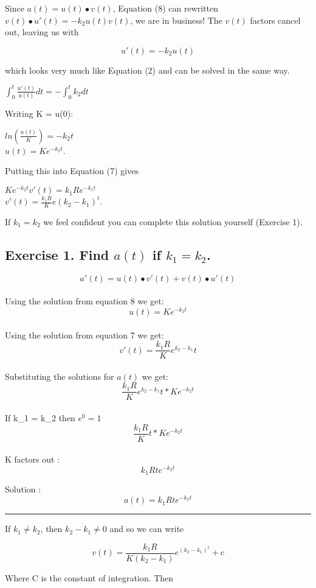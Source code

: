 \documentclass[]{article}
\begin{document}
Since \(a(t) = u(t) \bullet v(t)\), Equation (8) can rewritten
\(v(t) \bullet u'(t) = -k_2u(t)v(t)\), we are in business! The \(v(t)\)
factors cancel out, leaving us with

\[u'(t) = -k_2u(t)\]

which looks very much like Equation (2) and can be solved in the same
way.

\(\int_0^t \frac{u'(t)}{u(t)} dt = -\int_0^t k_2dt\)

Writing K = u(0):

\(ln (\frac{u(t)}{K}) = -k_2t\)\\
\(u(t) = Ke^{-k_2t}\).

Putting this into Equation (7) gives

\(Ke^{-k_2t}v'(t) = k_1Re^{-k_1t}\)\\
\(v'(t) = \frac{k_1R}{K}e(k_2-k_1)^t\).

If \(k_1 = k_2\) we feel confident you can complete this solution
yourself (Exercise 1).

\subsection{\texorpdfstring{Exercise 1. Find \(a(t)\) if
\(k_1 = k_2\).}{Exercise 1. Find a(t) if k\_1 = k\_2.}}\label{exercise-1.-find-at-if-k_1-k_2.}

\[a'(t) = u(t) \bullet v'(t) + v(t) \bullet u'(t)\]\\
Using the solution from equation 8 we get: \[u(t) = Ke^{-k_2t}\]\\
Using the solution from equation 7 we get:
\[v'(t) = \frac{k_1R}{K}e^{k_2 - k_1}t\]\\
Substituting the solutions for \(a(t)\) we get:
\[\frac{k_1R}{K}e^{k_2 - k_1}t * Ke^{-k_2t}\]\\
If k\_1 = k\_2 then \(e^{0} = 1\)\\
\[\frac{k_1R}{K}t * Ke^{-k_2t}\]\\
K factors out : \[k_1Rte^{-k_2t}\]

Solution : \[a(t) = k_1Rte^{-k_2t}\]

\begin{center}\rule{0.5\linewidth}{\linethickness}\end{center}

If \(k_1 \neq k_2\), then \(k_2 - k _1 \neq 0\) and so we can write

\[v(t) = \frac{k_1R}{K(k_2 - k_1)}e^(k_2 -k_1)^t +c\]

Where C is the constant of integration. Then
\end{document}
